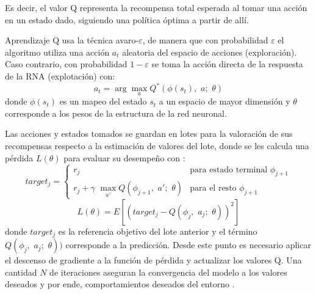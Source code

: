 Es decir, el valor Q representa la recompensa total esperada al tomar una acción en un estado dado, siguiendo una política óptima a partir de allí.

Aprendizaje Q usa la técnica avaro-$\varepsilon$, de manera que con probabilidad $\varepsilon$ el algoritmo utiliza una acción $a_t$ aleatoria del espacio de acciones (exploración). Caso contrario, con probabilidad $1-\varepsilon$ se toma la acción directa de la respuesta de la RNA (explotación) con:
\begin{equation}
a_t = \arg \max_a Q^*(\phi(s_t), \,\, a;\,\, \theta)
\label{ecu:accionDQN}
\end{equation}
donde $\phi(s_t)$ es un mapeo del estado $s_t$ a un espacio de mayor dimensión y $\theta$ corresponde a los pesos de la estructura de la red neuronal. 

Las acciones y estados tomados se guardan en lotes para la valoración de sus recompensas respecto a la estimación de valores del lote, donde se les calcula una pérdida $L(\theta)$ para evaluar su desempeño con \cite{DQNbase}:
\begin{equation}
target_j = \left\{ \begin{array}{ll}
r_j & \mbox{para estado terminal $\phi_{j+1}$} \\
r_j + \gamma \,\, \max_{a'} Q(\phi_{j+1},\,\, a';\,\, \theta) & \mbox{para el resto $\phi_{j+1}$}
\end{array}
\right.
\end{equation}
\begin{equation}
L(\theta) = E \left[(target_j - Q(\phi_j,  \,\, a_j;\,\, \theta))^2\right]
\end{equation}
donde $target_j$ es la referencia objetivo del lote anterior y el término $Q(\phi_j,  \,\, a_j;\,\, \theta))$ corresponde a la predicción. Desde este punto es necesario aplicar el descenso de gradiente a la función de pérdida y actualizar los valores Q. Una cantidad $N$ de iteraciones aseguran la convergencia del modelo a los valores deseados y por ende, comportamientos deseados del entorno \cite{DataScience}\cite{DQNbase}.

